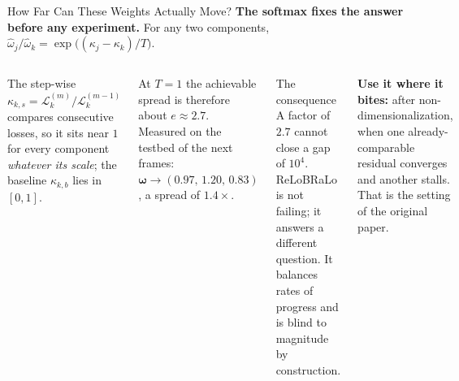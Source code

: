 \documentclass[aspectratio=169,11pt]{beamer}
\newcommand{\emphc}[1]{\textcolor{harvardcrimson}{#1}}
\begin{document}
\begin{frame}{How Far Can These Weights Actually Move?}
\textbf{The softmax fixes the answer before any experiment.} For any two components,
$\hat\omega_j / \hat\omega_k = \exp\bigl((\kappa_j - \kappa_k)/T\bigr)$.

\vspace{0.25cm}
\begin{columns}[T]
The step-wise $\kappa_{k,s} = \mathcal{L}_k^{(m)}/\mathcal{L}_k^{(m-1)}$ compares \emphc{consecutive} losses, so it sits near $1$ for every component \emph{whatever its scale}; the baseline $\kappa_{k,b}$ lies in $[0,1]$.

\vspace{0.2cm}
At $T=1$ the achievable spread is therefore about $e \approx 2.7$. Measured on the testbed of the next frames: $\bm{\omega} \to (0.97,\, 1.20,\, 0.83)$, a spread of \emphc{$1.4\times$}.

\begin{alertblock}{The consequence}
\footnotesize
A factor of $2.7$ cannot close a gap of $10^4$. ReLoBRaLo is not failing; it answers a different question. It balances \emphc{rates of progress} and is blind to \emphc{magnitude} by construction.
\end{alertblock}

\vspace{0.1cm}
{\footnotesize \textbf{Use it where it bites:} after non-dimensionalization, when one already-comparable residual converges and another stalls. That is the setting of the original paper.}
\end{columns}
\end{frame}
\end{document}
